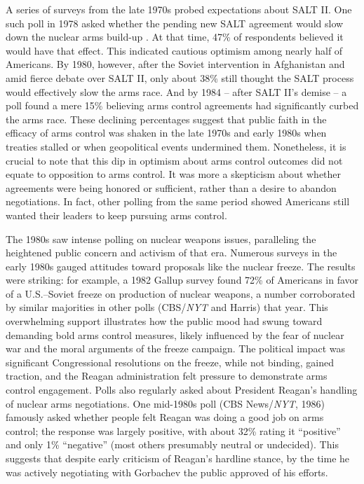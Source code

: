\documentclass[11,5 pt]{article}
\begin{document}
    A series of surveys from the late 1970s probed expectations about SALT II. One such poll in 1978 asked whether the pending new SALT agreement would slow down the nuclear arms build-up \cite{Graham1989}. At that time, 47\% of respondents believed it would have that effect. This indicated cautious optimism among nearly half of Americans. By 1980, however, after the Soviet intervention in Afghanistan and amid fierce debate over SALT II, only about 38\% still thought the SALT process would effectively slow the arms race. And by 1984 – after SALT II’s demise – a poll found a mere 15\% believing arms control agreements had significantly curbed the arms race. These declining percentages suggest that public faith in the efficacy of arms control was shaken in the late 1970s and early 1980s when treaties stalled or when geopolitical events undermined them. Nonetheless, it is crucial to note that this dip in optimism about arms control outcomes did not equate to opposition to arms control. It was more a skepticism about whether agreements were being honored or sufficient, rather than a desire to abandon negotiations. In fact, other polling from the same period showed Americans still wanted their leaders to keep pursuing arms control. 
    
    The 1980s saw intense polling on nuclear weapons issues, paralleling the heightened public concern and activism of that era. Numerous surveys in the early 1980s gauged attitudes toward proposals like the nuclear freeze. The results were striking: for example, a 1982 Gallup survey found 72\% of Americans in favor of a U.S.–Soviet freeze on production of nuclear weapons, a number corroborated by similar majorities in other polls (CBS/\textit{NYT} and Harris) that year. This overwhelming support illustrates how the public mood had swung toward demanding bold arms control measures, likely influenced by the fear of nuclear war and the moral arguments of the freeze campaign. The political impact was significant Congressional resolutions on the freeze, while not binding, gained traction, and the Reagan administration felt pressure to demonstrate arms control engagement. Polls also regularly asked about President Reagan’s handling of nuclear arms negotiations. One mid-1980s poll (CBS News/\textit{NYT}, 1986) famously asked whether people felt Reagan was doing a good job on arms control; the response was largely positive, with about 32\% rating it “positive” and only 1\% “negative” (most others presumably neutral or undecided). This suggests that despite early criticism of Reagan’s hardline stance, by the time he was actively negotiating with Gorbachev the public approved of his efforts. 
    
\end{document}
